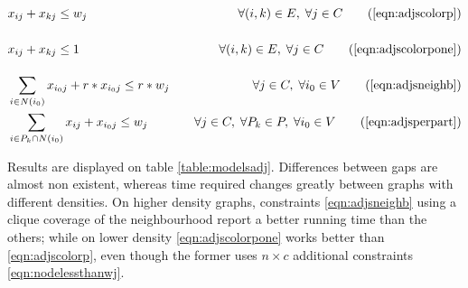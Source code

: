 \begin{align*}
&x_{ij} + x_{kj} \leq w_j \sumheight &\quad \forall (i,k) \in E, \; \forall j \in C \tag{\ref{eqn:adjscolorp}} \\
&x_{ij} + x_{kj} \leq 1 \sumheight &\quad \forall (i,k) \in E, \; \forall j \in C \tag{\ref{eqn:adjscolorpone}} \\
&\sum_{i \in N(i_0)} x_{i_0j} + r * x_{i_0j} \leq r * w_j &\quad \forall j \in C, \; \forall i_0 \in V \tag{\ref{eqn:adjsneighb}} \\
&\sum_{i \in P_k \cap N(i_0)} x_{ij} + x_{i_0j} \leq w_j &\quad \forall j \in C, \; \forall P_k \in P, \; \forall i_0 \in V \tag{\ref{eqn:adjsperpart}} 
\end{align*}

Results are displayed on table \ref{table:modelsadj}. Differences between gaps are almost non existent, whereas time required changes greatly between graphs with different densities. On higher density graphs, constraints \ref{eqn:adjsneighb} using a clique coverage of the neighbourhood report a better running time than the others; while on lower density \ref{eqn:adjscolorpone} works better than \ref{eqn:adjscolorp}, even though the former uses $n \times c$ additional constraints \ref{eqn:nodelessthanwj}.

